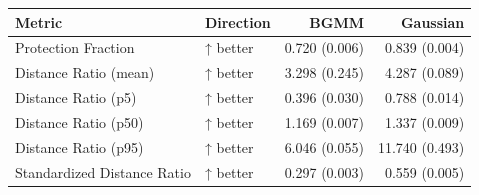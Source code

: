 \begin{tabular}{llrr}
\toprule
                     Metric & Direction &          BGMM &       Gaussian \\
\midrule
        Protection Fraction &  ↑ better & 0.720 (0.006) &  0.839 (0.004) \\
      Distance Ratio (mean) &  ↑ better & 3.298 (0.245) &  4.287 (0.089) \\
        Distance Ratio (p5) &  ↑ better & 0.396 (0.030) &  0.788 (0.014) \\
       Distance Ratio (p50) &  ↑ better & 1.169 (0.007) &  1.337 (0.009) \\
       Distance Ratio (p95) &  ↑ better & 6.046 (0.055) & 11.740 (0.493) \\
Standardized Distance Ratio &  ↑ better & 0.297 (0.003) &  0.559 (0.005) \\
\bottomrule
\end{tabular}
